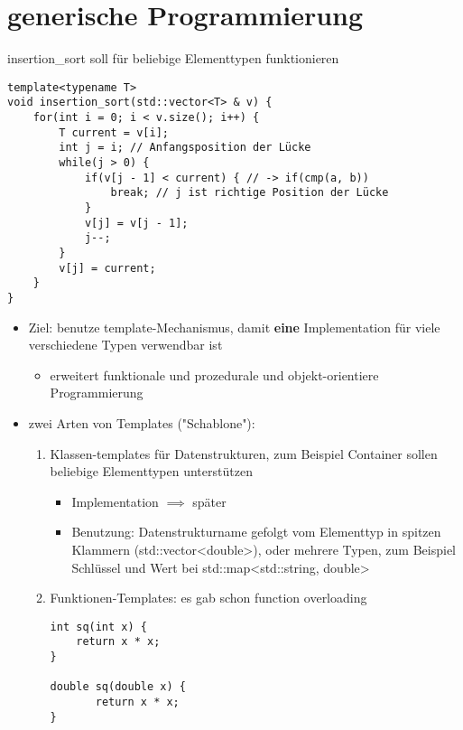 \documentclass[a4paper]{scrartcl}
\theoremstyle{definition}
\theoremstyle{plain}
\theoremstyle{remark}
\theoremstyle{remark}
\begin{document}
\section{generische Programmierung}
\label{sec-14}
insertion\_sort soll für beliebige Elementtypen funktionieren
\begin{verbatim}
template<typename T>
void insertion_sort(std::vector<T> & v) {
	for(int i = 0; i < v.size(); i++) {
		T current = v[i];
		int j = i; // Anfangsposition der Lücke
		while(j > 0) {
			if(v[j - 1] < current) { // -> if(cmp(a, b))
				break; // j ist richtige Position der Lücke
			}
			v[j] = v[j - 1];
			j--;
		}
		v[j] = current;
	}
}
\end{verbatim}
\begin{itemize}
\item Ziel: benutze template-Mechanismus, damit \textbf{eine} Implementation für viele verschiedene Typen verwendbar ist
\begin{itemize}
\item erweitert funktionale und prozedurale und objekt-orientiere Programmierung
\end{itemize}
\item zwei Arten von Templates ("Schablone"):
\begin{enumerate}
\item Klassen-templates für Datenstrukturen, zum Beispiel Container sollen beliebige Elementtypen unterstützen
\begin{itemize}
\item Implementation $\implies$ später
\item Benutzung: Datenstrukturname gefolgt vom Elementtyp in spitzen Klammern (std::vector<double>), oder mehrere Typen, zum Beispiel Schlüssel und Wert bei std::map<std::string, double>
\end{itemize}
\item Funktionen-Templates: es gab schon function overloading
\begin{verbatim}
int sq(int x) {
	return x * x;
}

double sq(double x) {
       return x * x;
}


\end{verbatim}
\end{enumerate}
\end{itemize}
\end{document}

